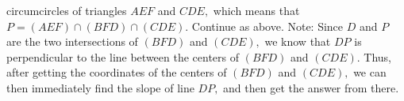 \documentclass[12pt]{article}
\begin{document}
circumcircles of triangles $AEF$ and $CDE,$ which means that $P=(AEF)\cap(BFD)\cap(CDE).$ Continue as above. Note: Since $D$ and $P$ are the two intersections of $(BFD)$ and $(CDE),$ we know that $DP$ is perpendicular to the line between the centers of $(BFD)$ and $(CDE).$ Thus, after getting the coordinates of the centers of $(BFD)$ and $(CDE),$ we can then immediately find the slope of line $DP,$ and then get the answer from there.
\end{document}
